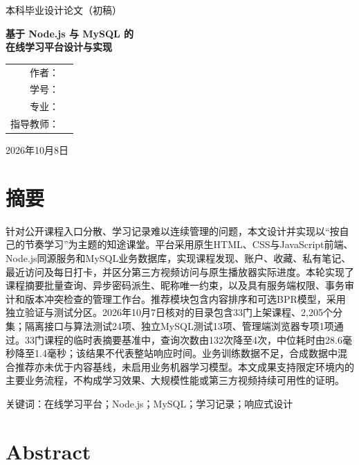 \documentclass[UTF8,12pt,a4paper,oneside,openany]{ctexbook}
\begin{document}
\begin{titlepage}\centering\vspace*{2cm}
{\LARGE 本科毕业设计论文（初稿）\par}\vspace{1.6cm}
{\Huge\bfseries 基于 Node.js 与 MySQL 的\\[.4cm]在线学习平台设计与实现\par}
\vspace{.8cm}{\Large ——以“知途课堂”为例\par}\vfill
\begin{tabular}{rl}作者：&\underline{\hspace{7cm}}\\[.6cm]学号：&\underline{\hspace{7cm}}\\[.6cm]专业：&\underline{\hspace{7cm}}\\[.6cm]指导教师：&\underline{\hspace{7cm}}\end{tabular}
\vspace{1.5cm}\par 2026年10月8日\end{titlepage}
\frontmatter
\chapter*{摘要}

针对公开课程入口分散、学习记录难以连续管理的问题，本文设计并实现以“按自己的节奏学习”为主题的知途课堂。平台采用原生HTML、CSS与JavaScript前端、Node.js同源服务和MySQL业务数据库，实现课程发现、账户、收藏、私有笔记、最近访问及每日打卡，并区分第三方视频访问与原生播放器实际进度。本轮实现了课程摘要批量查询、异步密码派生、昵称唯一约束，以及具有服务端权限、事务审计和版本冲突检查的管理工作台。推荐模块包含内容排序和可选BPR模型，采用独立验证与测试分区。2026年10月7日核对的目录包含33门上架课程、2,205个分集；隔离接口与算法测试24项、独立MySQL测试13项、管理端浏览器专项1项通过。33门课程的临时表摘要基准中，查询次数由132次降至4次，中位耗时由28.6毫秒降至1.4毫秒；该结果不代表整站响应时间。业务训练数据不足，合成数据中混合推荐亦未优于内容基线，未启用业务机器学习模型。本文成果支持限定环境内的主要业务流程，不构成学习效果、大规模性能或第三方视频持续可用性的证明。


关键词：在线学习平台；Node.js；MySQL；学习记录；响应式设计


\chapter*{Abstract}
\end{document}
